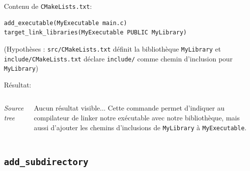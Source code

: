 \documentclass{beamer}
\newenvironment{Frame}{\begin{frame}[containsverbatim]{\subsecname}}{\end{frame}}
\begin{document}
\begin{Frame}
    \setlength{\DTbaselineskip}{0.3em}
    Contenu de \texttt{CMakeLists.txt}:
    
    \footnotesize
    \begin{verbatim}
add_executable(MyExecutable main.c)
target_link_libraries(MyExecutable PUBLIC MyLibrary)
    \end{verbatim}
    
    (Hypothèses : \texttt{src/CMakeLists.txt} définit la bibliothèque \verb|MyLibrary| et \texttt{include/CMakeLists.txt} déclare \texttt{include/} comme chemin d'inclusion pour \texttt{MyLibrary})

    \normalsize
    Résultat:
    \begin{columns}
        \footnotesize
        \begin{center}   
            \textit{Source tree}
        \end{center}

        Aucun résultat visible... Cette commande permet d'indiquer au compilateur de linker notre exécutable avec notre bibliothèque, mais aussi d'ajouter les chemins d'inclusions de \texttt{MyLibrary} à \texttt{MyExecutable}.
    \end{columns}
\end{Frame}

\subsection{\texttt{add\_subdirectory}}
\end{document}
